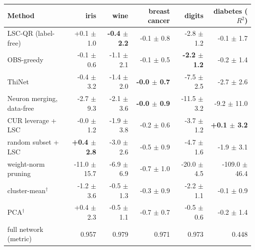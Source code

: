 \begin{tabular}{lrrrrr}\toprule
Method & iris & wine & breast cancer & digits & diabetes ($R^2$)\\\midrule
LSC-QR (label-free) & +0.1 $\pm$ 1.0 & \textbf{-0.4 $\pm$ 2.2} & -0.1 $\pm$ 0.8 & -2.8 $\pm$ 1.2 & -0.1 $\pm$ 1.7\\
OBS-greedy \cite{hassibi1993,dong2017} & -0.1 $\pm$ 0.6 & -1.1 $\pm$ 2.1 & -0.1 $\pm$ 0.5 & \textbf{-2.2 $\pm$ 1.2} & -0.2 $\pm$ 1.4\\
ThiNet \cite{luo2017} & -0.4 $\pm$ 3.2 & -1.4 $\pm$ 2.0 & \textbf{-0.0 $\pm$ 0.7} & -7.5 $\pm$ 2.5 & -2.7 $\pm$ 2.6\\
Neuron merging, data-free \cite{srinivas2015,kim2020} & -2.7 $\pm$ 9.3 & -2.1 $\pm$ 3.6 & \textbf{-0.0 $\pm$ 0.9} & -11.5 $\pm$ 3.2 & -9.2 $\pm$ 11.0\\
CUR leverage + LSC \cite{mahoney2009} & -0.0 $\pm$ 1.2 & -1.9 $\pm$ 3.8 & -0.2 $\pm$ 0.6 & -3.7 $\pm$ 1.2 & \textbf{+0.1 $\pm$ 3.2}\\
random subset + LSC & \textbf{+0.4 $\pm$ 2.8} & -3.0 $\pm$ 2.6 & -0.5 $\pm$ 0.9 & -4.7 $\pm$ 1.6 & -1.9 $\pm$ 3.1\\
weight-norm pruning \cite{han2015} & -11.0 $\pm$ 15.7 & -6.9 $\pm$ 6.9 & -0.7 $\pm$ 1.0 & -20.0 $\pm$ 4.5 & -109.0 $\pm$ 46.4\\
cluster-mean$^\dagger$ & -1.2 $\pm$ 3.6 & -0.5 $\pm$ 1.3 & -0.3 $\pm$ 0.9 & -2.2 $\pm$ 1.1 & -0.1 $\pm$ 0.9\\
PCA$^\dagger$ & +0.4 $\pm$ 2.3 & -0.5 $\pm$ 1.1 & -0.7 $\pm$ 0.7 & -0.5 $\pm$ 0.6 & -0.2 $\pm$ 1.4\\
\midrule
full network (metric) & 0.957 & 0.979 & 0.971 & 0.973 & 0.448\\
\bottomrule\end{tabular}
